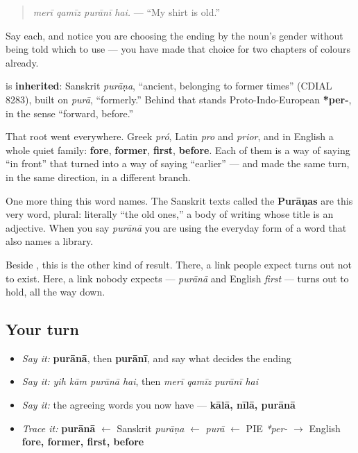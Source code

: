 \begin{quote}
\emph{merī qamīz purānī hai.} — \textquotedblleft{}My shirt is old.\textquotedblright{}
\end{quote}

Say each, and notice you are choosing the ending by the noun's gender without being told which to use — you have made that choice for two chapters of colours already.

\begin{cousinweb}
\textbf{} is \textbf{inherited}: Sanskrit \emph{purāṇa}, \textquotedblleft{}ancient, belonging to former times\textquotedblright{} (CDIAL 8283), built on \emph{purā}, \textquotedblleft{}formerly.\textquotedblright{} Behind that stands Proto-Indo-European \textbf{*per-}, in the sense \textquotedblleft{}forward, before.\textquotedblright{}

That root went everywhere. Greek \emph{pró}, Latin \emph{pro} and \emph{prior}, and in English a whole quiet family: \textbf{fore}, \textbf{former}, \textbf{first}, \textbf{before}. Each of them is a way of saying \textquotedblleft{}in front\textquotedblright{} that turned into a way of saying \textquotedblleft{}earlier\textquotedblright{} — and \textbf{} made the same turn, in the same direction, in a different branch.

One more thing this word names. The Sanskrit texts called the \textbf{Purāṇas} are this very word, plural: literally \textquotedblleft{}the old ones,\textquotedblright{} a body of writing whose title is an adjective. When you say \emph{purānā} you are using the everyday form of a word that also names a library.

Beside \textbf{}, this is the other kind of result. There, a link people expect turns out not to exist. Here, a link nobody expects — \emph{purānā} and English \emph{first} — turns out to hold, all the way down.
\end{cousinweb}

\subsection*{Your turn}
\begin{itemize}
\raggedright
  \item \emph{Say it:} \textbf{purānā}, then \textbf{purānī}, and say what decides the ending
  \item \emph{Say it:} \emph{yih kām purānā hai}, then \emph{merī qamīz purānī hai}
  \item \emph{Say it:} the agreeing words you now have — \textbf{kālā, nīlā, purānā}
  \item \emph{Trace it:} \textbf{purānā} $\leftarrow$ Sanskrit \emph{purāṇa} $\leftarrow$ \emph{purā} $\leftarrow$ PIE \emph{*per-} $\to$ English \textbf{fore, former, first, before}
\end{itemize}

